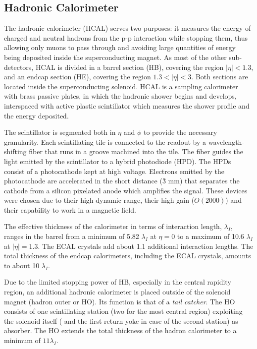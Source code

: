 \subsection{Hadronic Calorimeter}

The hadronic calorimeter (HCAL) serves two purposes: it measures the energy of charged and neutral hadrons from the p-p interaction while stopping them, thus allowing only muons to pass through and avoiding large quantities of energy being deposited inside the superconducting magnet. As most of the other sub-detectors, HCAL is divided in a barrel section (HB), covering the region $|\eta| < 1.3$, and an endcap section (HE), covering the region $1.3 < |\eta| < 3$. Both sections are located inside the superconducting solenoid. HCAL is a sampling calorimeter with brass passive plates, in which the hadronic shower begins and develops, interspaced with active plastic scintillator which measures the shower profile and the energy deposited. 

The scintillator is segmented both in $\eta$ and $\phi$ to provide the necessary granularity. Each scintillating tile is connected to the readout by a wavelength-shifting fiber that runs in a groove machined into the tile. The fiber guides the light emitted by the scintillator to a hybrid photodiode (HPD). The HPDs consist of a photocathode kept at high voltage. Electrons emitted by the photocathode are accelerated in the short distance (\~3 mm) that separates the cathode from a silicon pixelated anode which amplifies the signal. These devices were chosen due to their high dynamic range, their high gain ($O(2000)$) and their capability to work in a magnetic field.

The effective thickness of the calorimeter in terms of interaction length, $\lambda_I$, ranges in the barrel from a minimum of 5.82 $\lambda_I$ at $\eta=0$ to a maximum of 10.6 $\lambda_I$ at $|\eta| = 1.3$. The ECAL crystals add about 1.1 additional interaction lengths. The total thickness of the endcap calorimeters, including the ECAL crystals, amounts to about 10 $\lambda_I$.

Due to the limited stopping power of HB, especially in the central rapidity region, an additional hadronic calorimeter is placed outside of the solenoid magnet (hadron outer or HO). Its function is that of a \emph{tail catcher}. The HO consists of one scintillating station (two for the most central region) exploiting the solenoid itself ( and the first return yoke in case of the second station) as absorber. The HO extends the total thickness of the hadron calorimeter to a minimum of $11 \lambda_I$.

